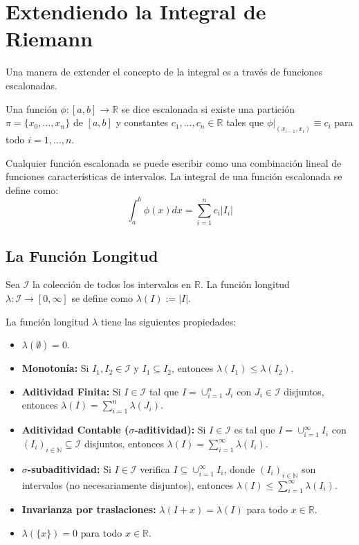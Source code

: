 \documentclass[11pt]{article}
\begin{document}
\section{Extendiendo la Integral de Riemann}
\label{sec:extending-riemann}

Una manera de extender el concepto de la integral es a través de funciones escalonadas.

\begin{definition}
Una función $\phi:[a,b] \rightarrow \mathbb{R}$ se dice escalonada si existe una partición $\pi = \{x_0, \dots, x_n\}$ de $[a,b]$ y constantes $c_1, \dots, c_n \in \mathbb{R}$ tales que $\phi|_{(x_{i-1}, x_i)} \equiv c_i$ para todo $i=1,\dots,n$.
\end{definition}

Cualquier función escalonada se puede escribir como una combinación lineal de funciones características de intervalos. La integral de una función escalonada se define como:
$$ \int_{a}^{b} \phi(x)dx = \sum_{i=1}^{n} c_i |I_i| $$

\subsection{La Función Longitud}
\label{sec:length-function}

Sea $\mathcal{I}$ la colección de todos los intervalos en $\mathbb{R}$. La función longitud $\lambda:\mathcal{I} \rightarrow [0, \infty]$ se define como $\lambda(I) := |I|$.

\begin{property}
La función longitud $\lambda$ tiene las siguientes propiedades:
\begin{itemize}
    \item $\lambda(\emptyset) = 0$.
    \item \textbf{Monotonía:} Si $I_1, I_2 \in \mathcal{I}$ y $I_1 \subseteq I_2$, entonces $\lambda(I_1) \le \lambda(I_2)$.
    \item \textbf{Aditividad Finita:} Si $I \in \mathcal{I}$ tal que $I = \cup_{i=1}^{n} J_i$ con $J_i \in \mathcal{I}$ disjuntos, entonces $\lambda(I) = \sum_{i=1}^{n} \lambda(J_i)$.
    \item \textbf{Aditividad Contable ($\sigma$-aditividad):} Si $I \in \mathcal{I}$ es tal que $I = \cup_{i=1}^{\infty} I_i$ con $(I_i)_{i \in \mathbb{N}} \subseteq \mathcal{I}$ disjuntos, entonces $\lambda(I) = \sum_{i=1}^{\infty} \lambda(I_i)$.
    \item \textbf{$\sigma$-subaditividad:} Si $I \in \mathcal{I}$ verifica $I \subseteq \cup_{i=1}^{\infty} I_i$, donde $(I_i)_{i \in \mathbb{N}}$ son intervalos (no necesariamente disjuntos), entonces $\lambda(I) \le \sum_{i=1}^{\infty} \lambda(I_i)$.
    \item \textbf{Invarianza por traslaciones:} $\lambda(I+x) = \lambda(I)$ para todo $x \in \mathbb{R}$.
    \item $\lambda(\{x\}) = 0$ para todo $x \in \mathbb{R}$.
\end{itemize}
\end{property}
\end{document}
